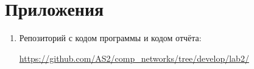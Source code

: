\section{Приложения} \label{app}

\begin{enumerate}
	\item Репозиторий с кодом программы и кодом отчёта:
	
	\href{https://github.com/AS2/comp_networks/tree/develop/lab2/}{https://github.com/AS2/comp_networks/tree/develop/lab2/}

\end{enumerate}
